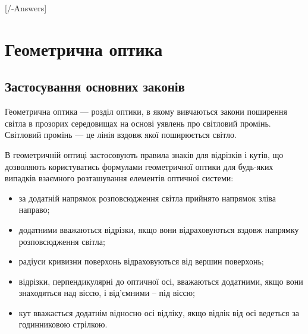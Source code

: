 
[\currfilebase/\currfilebase-Answers]
\chapter{Геометрична оптика}\label{\currfilebase}
\makeatletter
{}
\makeatother

\section{Застосування основних законів}


Геометрична оптика --- розділ оптики, в якому вивчаються закони поширення світла в прозорих середовищах на основі уявлень про світловий промінь. Світловий промінь --- це лінія вздовж якої поширюється світло.

В геометричній оптиці застосовують правила знаків для відрізків і кутів,
що дозволяють користуватись формулами геометричної оптики для будь-яких випадків взаємного розташування елементів оптичної системи:
\begin{itemize}
	\item за додатній напрямок розповсюдження світла прийнято напрямок
	      зліва направо;
	\item додатними вважаються відрізки, якщо вони відраховуються вздовж
	      напрямку розповсюдження світла;
	\item радіуси кривизни поверхонь відраховуються від вершин поверхонь;
	\item відрізки, перпендикулярні до оптичної осі, вважаються додатними,
	      якщо вони знаходяться над віссю, і від’ємними – під віссю;
	\item кут вважається додатнім відносно осі відліку, якщо відлік від осі
	      ведеться за годинниковою стрілкою.
\end{itemize}

